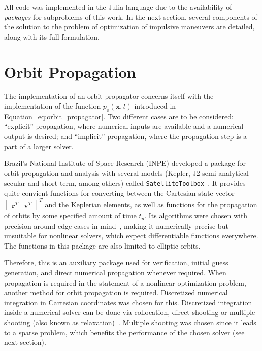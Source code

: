 
All code was implemented in the Julia language due to the availability of \textit{packages} for subproblems of this work. In the next section, several components of the solution to the problem of optimization of impulsive maneuvers are detailed, along with its full formulation.

\section{Orbit Propagation}\label{sec:orbit_propagation}

The implementation of an orbit propagator concerns itself with the implementation of the function \(p_o(\mathbf{x}, t)\) introduced in Equation~\eqref{eq:orbit_propagator}. Two different cases are to be considered: ``explicit'' propagation, where numerical inputs are available and a numerical output is desired; and ``implicit'' propagation, where the propagation step is a part of a larger solver.

Brazil's National Institute of Space Research (INPE) developed a package for orbit propagation and analysis with several models (Kepler, J2 semi-analytical secular and short term, among others) called \texttt{SatelliteToolbox}~\cite{satellitetoolbox}. It provides quite convient functions for converting between the Cartesian state vector \(\begin{bmatrix}
    \mathbf{r}^T & \mathbf{v}^T
\end{bmatrix}^T\) and the Keplerian elements, as well as functions for the propagation of orbits by some specified amount of time \(t_p\). Its algorithms were chosen with precision around edge cases in mind~\cite{rv_to_kepler}, making it numerically precise but unsuitable for nonlinear solvers, which expect differentiable functions everywhere. The functions in this package are also limited to elliptic orbits.

Therefore, this is an auxiliary package used for verification, initial guess generation, and direct numerical propagation whenever required. When propagation is required in the statement of a nonlinear optimization problem, another method for orbit propagation is required. Discretized numerical integration in Cartesian coordinates was chosen for this. Discretized integration inside a numerical solver can be done via collocation, direct shooting or multiple shooting (also known as relaxation)~\cite{numerical_recipes}. Multiple shooting was chosen since it leads to a sparse problem, which benefits the performance of the chosen solver (see next section).

